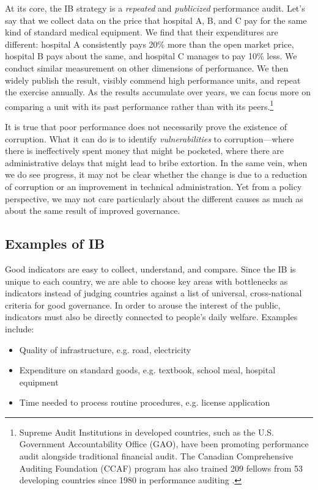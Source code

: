 \documentclass[12pt]{article}
\begin{document}
At its core, the IB strategy is a \textit{repeated} and \textit{publicized} performance audit. Let's say that we collect data on the price that hospital A, B, and C pay for the same kind of standard medical equipment. We find that their expenditures are different: hospital A consistently pays 20\% more than the open market price, hospital B pays about the same, and hospital C manages to pay 10\% less. We conduct similar measurement on other dimensions of performance. We then widely publish the result, visibly commend high performance units, and repeat the exercise annually. As the results accumulate over years, we can focus more on comparing a unit with its past performance rather than with its peers.\footnote{Supreme Audit Institutions in developed countries, such as the U.S. Government Accountability Office (GAO), have been promoting performance audit alongside traditional financial audit. The Canadian Comprehensive Auditing Foundation (CCAF) program has also trained 209 fellows from 53 developing countries since 1980 in performance auditing \citep{CPB2010}.}

It is true that poor performance does not necessarily prove the existence of corruption. What it can do is to identify \textit{vulnerabilities} to corruption---where there is ineffectively spent money that might be pocketed, where there are administrative delays that might lead to bribe extortion. In the same vein, when we do see progress, it may not be clear whether the change is due to a reduction of corruption or an improvement in technical administration. Yet from a policy perspective, we may not care particularly about the different causes as much as about the same result of improved governance.

\subsection{Examples of IB} \label{sec:ibexample}

Good indicators are easy to collect, understand, and compare. Since the IB is unique to each country, we are able to choose key areas with bottlenecks as indicators instead of judging countries against a list of universal, cross-national criteria for good governance. In order to arouse the interest of the public, indicators must also be directly connected to people's daily welfare. Examples include:
\begin{itemize}[noitemsep]
\item{Quality of infrastructure, e.g. road, electricity}
\item{Expenditure on standard goods, e.g. textbook, school meal, hospital equipment}
\item{Time needed to process routine procedures, e.g. license application}
\end{itemize}
\end{document}
